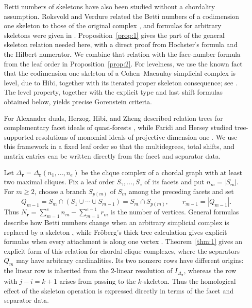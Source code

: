 \documentclass[11pt]{amsart}
\theoremstyle{definition}
\theoremstyle{remark}
\begin{document}
	Betti numbers of skeletons have also been studied without a chordality assumption. Roksvold and Verdure related the Betti numbers of a codimension one skeleton to those of the original complex \cite{RV15}, and formulas for arbitrary skeletons were given in \cite{Namiq2}. Proposition~\ref{prop:1} gives the part of the general skeleton relation needed here, with a direct proof from Hochster's formula and the Hilbert numerator. We combine that relation with the face-number formula from the leaf order in Proposition~\ref{prop:2}. For levelness, we use the known fact that the codimension one skeleton of a Cohen--Macaulay simplicial complex is level, due to Hibi, together with its iterated proper skeleton consequence; see \cite{HerzogHibi99,HibiLevel}. The level property, together with the explicit type and last shift formulas obtained below, yields precise Gorenstein criteria.
	
	For Alexander duals, Herzog, Hibi, and Zheng described relation trees for complementary facet ideals of quasi-forests \cite{HHZ04}, while Faridi and Hersey studied tree-supported resolutions of monomial ideals of projective dimension one \cite{FaridiHersey}. We use this framework in a fixed leaf order so that the multidegrees, total shifts, and matrix entries can be written directly from the facet and separator data.
	
	Let $\Delta_{\mathbf r}=\Delta_{\mathbf r}(n_1,\ldots,n_e)$ be the clique complex of a chordal graph with at least two maximal cliques. Fix a leaf order $S_1,\ldots,S_e$ of its facets and put $n_m=|S_m|$. For $m\ge2$, choose a branch $S_{p(m)}$ of $S_m$ among the preceding facets and set
	\[
	Q_{m-1}=S_m\cap(S_1\cup\cdots\cup S_{m-1})=S_m\cap S_{p(m)},
	\qquad r_{m-1}=|Q_{m-1}|.
	\]
	Thus $N_{\mathbf r}=\sum_{m=1}^e n_m-\sum_{m=1}^{e-1}r_m$ is the number of vertices. General formulas describe how Betti numbers change when an arbitrary simplicial complex is replaced by a skeleton \cite{Namiq2}, while Fr\"oberg's thick tree calculation gives explicit formulas when every attachment is along one vertex \cite{Fr2}. Theorem~\ref{thm:1} gives an explicit form of this relation for chordal clique complexes, where the separators $Q_m$ may have arbitrary cardinalities. Its two nonzero rows have different origins: the linear row is inherited from the $2$-linear resolution of $I_{\Delta_{\mathbf r}}$, whereas the row with $j-i=k+1$ arises from passing to the $k$-skeleton. Thus the homological effect of the skeleton operation is expressed directly in terms of the facet and separator data.
	
\end{document}
